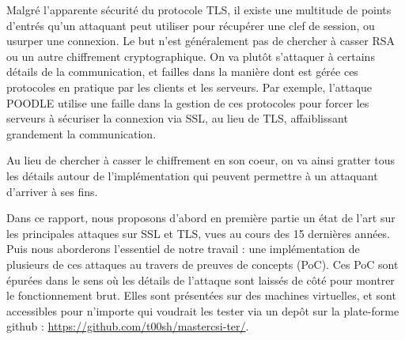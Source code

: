 Malgré l'apparente sécurité du protocole TLS, il existe une multitude de points d'entrés qu'un attaquant peut utiliser pour récupérer une clef de session, ou usurper une connexion. Le but n'est généralement pas de chercher à casser RSA ou un autre chiffrement cryptographique. On va plutôt s'attaquer à certains détails de la communication, et failles dans la manière dont est gérée ces protocoles en pratique par les clients et les serveurs. Par exemple, l'attaque POODLE utilise une faille dans la gestion de ces protocoles pour forcer les serveurs à sécuriser la connexion via SSL, au lieu de TLS, affaiblissant grandement la communication.

Au lieu de chercher à casser le chiffrement en son coeur, on va ainsi gratter tous les détails autour de l'implémentation qui peuvent permettre à un attaquant d'arriver à ses fins.

Dans ce rapport, nous proposons d'abord en première partie un état de l'art sur les principales attaques sur SSL et TLS, vues au cours des 15 dernières années. Puis nous aborderons l'essentiel de notre travail : une implémentation de plusieurs de ces attaques au travers de preuves de concepts (PoC). Ces PoC sont épurées dans le sens où les détails de l'attaque sont laissés de côté pour montrer le fonctionnement brut. Elles sont présentées sur des machines virtuelles, et sont accessibles pour n'importe qui voudrait les tester via un depôt sur la plate-forme github : \url{https://github.com/t00sh/mastercsi-ter/}.
